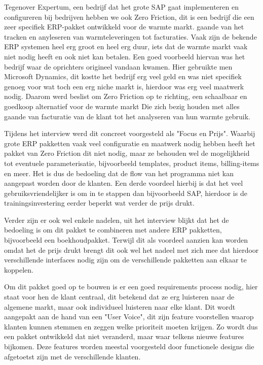 Tegenover Expertum, een bedrijf dat het grote SAP gaat implementeren en configureren bij bedrijven hebben we ook Zero Friction, dit is een bedrijf die een zeer specifiek ERP-pakket ontwikkeld voor de warmte markt. gaande van het tracken en anyleseren van warmteleveringen tot facturaties. Vaak zijn de bekende ERP systemen heel erg groot en heel erg duur, iets dat de warmte markt vaak niet nodig heeft en ook niet kan betalen. Een goed voorbeeld hiervan was het bedrijf waar de oprichters origineel vandaan kwamen. Hier gebruikte men Microsoft Dynamics, dit kostte het bedrijf erg veel geld en was niet specifiek genoeg voor wat toch een erg niche markt is, hierdoor was erg veel maatwerk nodig. Daarom werd beslist om Zero Friction op te richting, een schaalbaar en goedkoop alternatief voor de warmte markt Die zich bezig houden met alles gaande van facturatie van de klant tot het analyseren van hun warmte gebruik. 

Tijdens het interview werd dit concreet voorgesteld als "Focus en Prijs". Waarbij grote ERP pakketten vaak veel configuratie en maatwerk nodig hebben heeft het pakket van Zero Friction dit niet nodig, maar ze behouden wel de mogelijkheid tot eventuele parameterisatie, bijvoorbeeld templates, product items, billing-items en meer. Het is dus de bedoeling dat de flow van het programma niet kan aangepast worden door de klanten. Een derde voordeel hierbij is dat het veel gebruiksvriendelijker is om in te stappen dan bijvoorbeeld SAP, hierdoor is de trainingsinvestering eerder beperkt wat verder de prijs drukt.

Verder zijn er ook wel enkele nadelen, uit het interview blijkt dat het de bedoeling is om dit pakket te combineren met andere ERP pakketten, bijvoorbeeld een boekhoudpakket. Terwijl dit als voordeel aanzien kan worden omdat het de prijs drukt brengt dit ook wel het nadeel met zich mee dat hierdoor verschillende interfaces nodig zijn om de verschillende pakketten aan elkaar te koppelen.

Om dit pakket goed op te bouwen is er een goed requirements process nodig, hier staat voor hen de klant centraal, dit betekend dat ze erg luisteren naar de algemene markt, maar ook individueel luisteren naar elke klant. Dit wordt aangepakt aan de hand van een "User Voice", dit zijn feature voorstellen waarop klanten kunnen stemmen en zeggen welke prioriteit moeten krijgen. Zo wordt dus een pakket ontwikkeld dat niet veranderd, maar waar telkens nieuwe features bijkomen. Deze features worden meestal voorgesteld door functionele designs die afgetoetst zijn met de verschillende klanten. 

